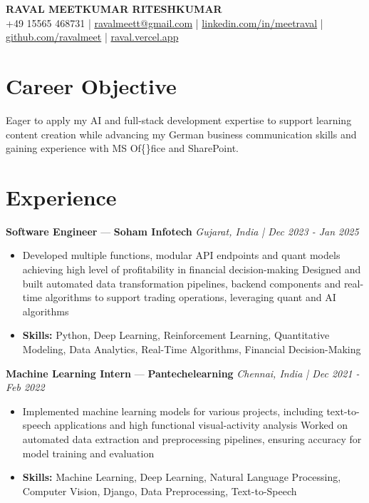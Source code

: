 \documentclass[a4paper,10pt]{article}
\begin{document}
\begin{center}
  {\Large\bfseries RAVAL MEETKUMAR RITESHKUMAR}\\[2pt]
  {\small +49 15565 468731 \;|\; \href{mailto:ravalmeett@gmail.com}{ravalmeett@gmail.com} \;|\; \href{https://www.linkedin.com/in/meetraval/}{linkedin.com/in/meetraval} \;|\; \href{https://github.com/ravalmeet}{github.com/ravalmeet} \;|\; \href{https://raval.vercel.app/}{raval.vercel.app}}
\end{center}
\vspace{-3pt}

\section*{Career Objective}
Eager to apply my AI and full-stack development expertise to support learning content creation while advancing my German business communication skills and gaining experience with MS Of\{\}fice and SharePoint.\par

\section*{Experience}
\textbf{Software Engineer} — \textbf{Soham Infotech} \hfill \textit{Gujarat, India \;|\; Dec 2023 - Jan 2025}\par
\vspace{1pt}
\begin{itemize}
  \item Developed multiple functions, modular API endpoints and quant models achieving high level of profitability in financial decision-making Designed and built automated data transformation pipelines, backend components and real-time algorithms to support trading operations, leveraging quant and AI algorithms
  \item \textbf{Skills:} Python, Deep Learning, Reinforcement Learning, Quantitative Modeling, Data Analytics, Real-Time Algorithms, Financial Decision-Making
\end{itemize}
\vspace{3pt}
\textbf{Machine Learning Intern} — \textbf{Pantechelearning} \hfill \textit{Chennai, India \;|\; Dec 2021 - Feb 2022}\par
\vspace{1pt}
\begin{itemize}
  \item Implemented machine learning models for various projects, including text-to-speech applications and high functional visual-activity analysis Worked on automated data extraction and preprocessing pipelines, ensuring accuracy for model training and evaluation
  \item \textbf{Skills:} Machine Learning, Deep Learning, Natural Language Processing, Computer Vision, Django, Data Preprocessing, Text-to-Speech
\end{itemize}
\end{document}
